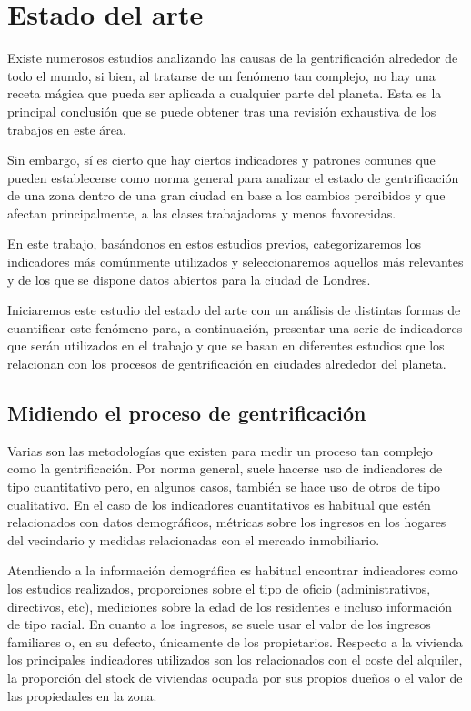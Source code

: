 \documentclass[12pt,a4paper,twoside]{book}
\begin{document}
\chapter{Estado del arte}

Existe numerosos estudios analizando las causas de la gentrificación alrededor de todo el mundo, si bien, al tratarse de un fenómeno tan complejo, no hay una receta mágica que pueda ser aplicada a cualquier parte del planeta. Esta es la principal conclusión que se puede obtener tras una revisión exhaustiva de los trabajos en este área.

Sin embargo, sí es cierto que hay ciertos indicadores y patrones comunes que pueden establecerse como norma general para analizar el estado de gentrificación de una zona dentro de una gran ciudad en base a los cambios percibidos y que afectan principalmente, a las clases trabajadoras y menos favorecidas.

En este trabajo, basándonos en estos estudios previos, categorizaremos los indicadores más comúnmente utilizados y seleccionaremos aquellos más relevantes y de los que se dispone datos abiertos para la ciudad de Londres.

Iniciaremos este estudio del estado del arte con un análisis de distintas formas de cuantificar este fenómeno para, a continuación, presentar una serie de indicadores que serán utilizados en el trabajo y que se basan en diferentes estudios que los relacionan con los procesos de gentrificación en ciudades alrededor del planeta.

\section{Midiendo el proceso de gentrificación} \label{medicion_gentrificacion}

Varias son las metodologías que existen para medir un proceso tan complejo como la gentrificación. Por norma general, suele hacerse uso de indicadores de tipo cuantitativo pero, en algunos casos, también se hace uso de otros de tipo cualitativo. 
En el caso de los indicadores cuantitativos es habitual que estén relacionados con datos demográficos, métricas sobre los ingresos en los hogares del vecindario y medidas relacionadas con el mercado inmobiliario. 

Atendiendo a la información demográfica es habitual encontrar indicadores como los estudios realizados, proporciones sobre el tipo de oficio (administrativos, directivos, etc), mediciones sobre la edad de los residentes e incluso información de tipo racial.
En cuanto a los ingresos, se suele usar el valor de los ingresos familiares o, en su defecto, únicamente de los propietarios.
Respecto a la vivienda los principales indicadores utilizados son los relacionados con el coste del alquiler, la proporción del stock de viviendas ocupada por sus propios dueños o el valor de las propiedades en la zona.
\end{document}
